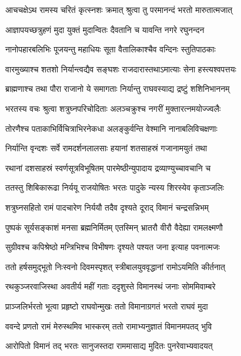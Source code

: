\twolineshloka
{आचचक्षेऽथ रामस्य चरितं कृत्स्नशः क्रमात्}
{श्रुत्वा तु परमानन्दं भरतो मारुतात्मजात्} %

\twolineshloka
{आज्ञापयच्छत्रुहणं मुदा युक्तं मुदान्वितः}
{दैवतानि च यावन्ति नगरे रघुनन्दन} %

\twolineshloka
{नानोपहारबलिभिः पूजयन्तु महाधियः}
{सूता वैतालिकाश्चैव वन्दिनः स्तुतिपाठकाः} %

\twolineshloka
{वारमुख्याश्च शतशो निर्यान्त्वद्यैव सङ्घशः}
{राजदारास्तथाऽमात्याः सेना हस्त्यश्वपत्तयः} %

\twolineshloka
{ब्राह्मणाश्च तथा पौरा राजानो ये समागताः}
{निर्यान्तु राघवस्याद्य द्रष्टुं शशिनिभाननम्} %

\twolineshloka
{भरतस्य वचः श्रुत्वा शत्रुघ्नपरिचोदिताः}
{अलञ्चक्रुश्च नगरीं मुक्तारत्नमयोज्ज्वलैः} %

\twolineshloka
{तोरणैश्च पताकाभिर्विचित्राभिरनेकधा}
{अलङ्कुर्वन्ति वेश्मानि नानाबलिविचक्षणाः} %

\twolineshloka
{निर्यान्ति वृन्दशः सर्वे रामदर्शनलालसाः}
{हयानां शतसाहस्रं गजानामयुतं तथा} %

\twolineshloka
{रथानां दशसाहस्रं स्वर्णसूत्रविभूषितम्}
{पारमेष्ठीन्युपादाय द्रव्याण्युच्चावचानि च} %

\twolineshloka
{ततस्तु शिबिकारूढा निर्ययू राजयोषितः}
{भरतः पादुके न्यस्य शिरस्येव कृताञ्जलिः} %

\twolineshloka
{शत्रुघ्नसहितो रामं पादचारेण निर्ययौ}
{तदैव दृश्यते दूराद् विमानं चन्द्रसन्निभम्} %

\twolineshloka
{पुष्पकं सूर्यसङ्काशं मनसा ब्रह्मनिर्मितम्}
{एतस्मिन् भ्रातरौ वीरौ वैदेह्या रामलक्ष्मणौ} %

\twolineshloka
{सुग्रीवश्च कपिश्रेष्ठो मन्त्रिभिश्च विभीषणः}
{दृश्यते पश्यत जना इत्याह पवनात्मजः} %

\twolineshloka
{ततो हर्षसमुद्भूतो निःस्वनो दिवमस्पृशत्}
{स्त्रीबालयुववृद्धानां रामोऽयमिति कीर्तनात्} %

\twolineshloka
{रथकुञ्जरवाजिस्था अवतीर्य महीं गताः}
{ददृशुस्ते विमानस्थं जनाः सोममिवाम्बरे} %

\twolineshloka
{प्राञ्जलिर्भरतो भूत्वा प्रहृष्टो राघवोन्मुखः}
{ततो विमानाग्रगतं भरतो राघवं मुदा} %

\twolineshloka
{ववन्दे प्रणतो रामं मेरुस्थमिव भास्करम्}
{ततो रामाभ्यनुज्ञातं विमानमपतद् भुवि} %

\twolineshloka
{आरोपितो विमानं तद् भरतः सानुजस्तदा}
{राममासाद्य मुदितः पुनरेवाभ्यवादयत्} %

